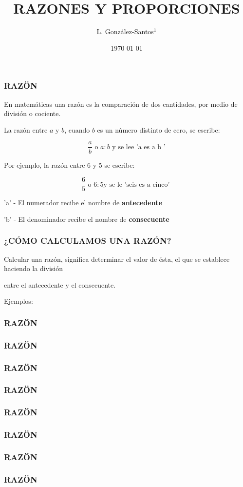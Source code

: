 \documentclass{beamer}
\title[santosg572@gmail.com]{RAZONES Y PROPORCIONES}
\author[L. González-Santos]{
L. González-Santos$^{1}$}
\institute[EDEN \& HELL]{
  $^{1}$
  Instituto de Neurobiología, UNAM\\
  Campus Juriquilla, Qro.
  \and
  \texttt{$^{1}$lgs@unam.mx}
}
\date{\today}
\begin{document}
\frame{\titlepage}

\begin{frame}
    \frametitle{RAZÖN}

En matemáticas una razón es la comparación de dos cantidades, por medio de división o cociente. 

\hfill

La razón entre $a$ y $b$, cuando $b$ es un número distinto de 
cero, se escribe:

$$
\frac{a}{b} \text{   o } a:b \text{ y se lee 'a es a b '}
$$

Por ejemplo, la razón entre 6 y 5 se escribe:

$$
\frac{6}{5} \text{ o } 6:5 \text{y se le 'seis es a cinco' }
$$

'a' - El numerador recibe el nombre de \textbf{antecedente}

\hfill

'b' - El denominador recibe el nombre de \textbf{consecuente}

\end{frame}


\begin{frame}
    \frametitle{¿CÓMO CALCULAMOS UNA RAZÓN?}

Calcular una razón, significa determinar el valor de ésta, el que se establece haciendo la división

entre el antecedente y el consecuente.

Ejemplos:


\end{frame}


\begin{frame}
    \frametitle{RAZÖN}


\end{frame}

\begin{frame}
    \frametitle{RAZÖN}


\end{frame}

\begin{frame}
    \frametitle{RAZÖN}


\end{frame}

\begin{frame}
    \frametitle{RAZÖN}


\end{frame}

\begin{frame}
    \frametitle{RAZÖN}


\end{frame}

\begin{frame}
    \frametitle{RAZÖN}


\end{frame}

\begin{frame}
    \frametitle{RAZÖN}


\end{frame}

\begin{frame}
    \frametitle{RAZÖN}


\end{frame}
\end{document}
